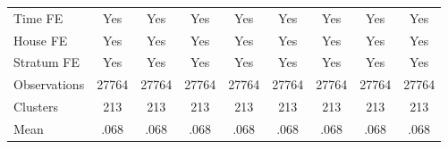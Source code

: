 {\begin{tabular}{l*{8}{c}}
Time FE         &      Yes         &      Yes         &      Yes         &      Yes         &      Yes         &      Yes         &      Yes         &      Yes         \\
House FE        &      Yes         &      Yes         &      Yes         &      Yes         &      Yes         &      Yes         &      Yes         &      Yes         \\
Stratum FE      &      Yes         &      Yes         &      Yes         &      Yes         &      Yes         &      Yes         &      Yes         &      Yes         \\
\hline
Observations    &    27764         &    27764         &    27764         &    27764         &    27764         &    27764         &    27764         &    27764         \\
Clusters        &      213         &      213         &      213         &      213         &      213         &      213         &      213         &      213         \\
Mean            &     .068         &     .068         &     .068         &     .068         &     .068         &     .068         &     .068         &     .068         \\
\hline\hline
\end{tabular}
}
